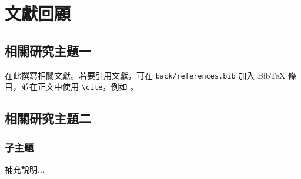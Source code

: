 
\chapter{文獻回顧}

\section{相關研究主題一}

在此撰寫相關文獻。若要引用文獻，可在 \texttt{back/references.bib} 加入 BibTeX 條目，並在正文中使用 \verb|\cite|，例如 \cite{example2020,example2019}。

\section{相關研究主題二}

\subsection{子主題}

補充說明...

